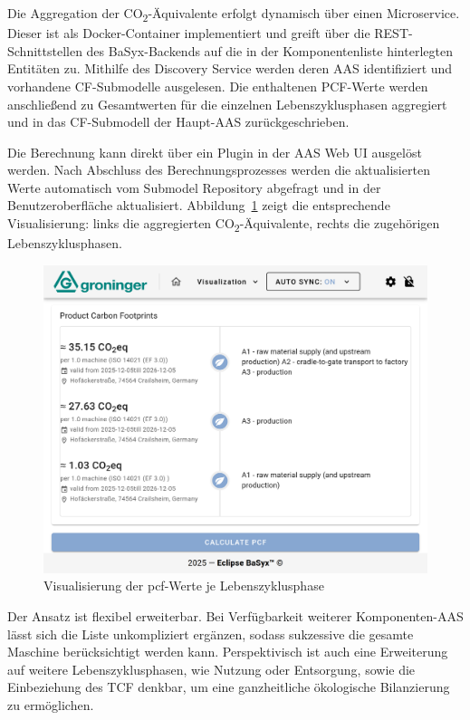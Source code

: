 Die Aggregation der CO\textsubscript{2}-Äquivalente erfolgt dynamisch über einen Microservice. 
Dieser ist als Docker-Container implementiert und greift über die REST-Schnittstellen des BaSyx-Backends auf die in der Komponentenliste hinterlegten Entitäten zu. 
Mithilfe des Discovery Service werden deren AAS identifiziert und vorhandene CF-Submodelle ausgelesen. 
Die enthaltenen PCF-Werte werden anschließend zu Gesamtwerten für die einzelnen Lebenszyklusphasen aggregiert und in das CF-Submodell der Haupt-AAS zurückgeschrieben.

Die Berechnung kann direkt über ein Plugin in der AAS Web UI ausgelöst werden.
Nach Abschluss des Berechnungsprozesses werden die aktualisierten Werte automatisch vom Submodel Repository abgefragt und in der Benutzeroberfläche aktualisiert.
Abbildung~\ref{fig:PluginAggregation} zeigt die entsprechende Visualisierung: links die aggregierten CO\textsubscript{2}-Äquivalente, rechts die zugehörigen Lebenszyklusphasen.

\begin{figure}[htbp]
    \centering
        \includegraphics[width=1\textwidth]{Bilder/ErgebnisseAASWebUI/CarbonFootprint.png}
    \caption{Visualisierung der \acs{pcf}-Werte je Lebenszyklusphase}
    \label{fig:PluginAggregation}
\end{figure}

Der Ansatz ist flexibel erweiterbar.
Bei Verfügbarkeit weiterer Komponenten-AAS lässt sich die Liste unkompliziert ergänzen, sodass sukzessive die gesamte Maschine berücksichtigt werden kann. 
Perspektivisch ist auch eine Erweiterung auf weitere Lebenszyklusphasen, wie Nutzung oder Entsorgung, sowie die Einbeziehung des TCF denkbar, um eine ganzheitliche ökologische Bilanzierung zu ermöglichen.


